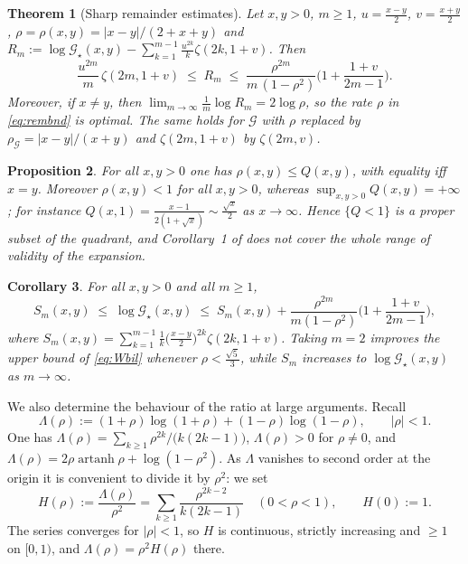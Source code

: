 \documentclass[11pt,a4paper]{amsart}
\newtheorem{theorem}{Theorem}[section]
\newtheorem{proposition}[theorem]{Proposition}
\newtheorem{corollary}[theorem]{Corollary}
\theoremstyle{definition}
\newcommand{\Gg}{\mathcal{G}}
\newcommand{\Gs}{\mathcal{G}_{\star}}
\DeclareMathOperator{\arsh}{artanh}
\begin{document}
\begin{theorem}[Sharp remainder estimates]\label{thm:rem}
Let $x,y>0$, $m\ge1$, $u=\tfrac{x-y}{2}$, $v=\tfrac{x+y}{2}$,
$\rho=\rho(x,y)=|x-y|/(2+x+y)$ and
$R_m:=\log\Gs(x,y)-\sum_{k=1}^{m-1}\frac{u^{2k}}{k}\zeta(2k,1+v)$. Then
\begin{equation}\label{eq:rembnd}
  \frac{u^{2m}}{m}\,\zeta(2m,1+v)\;\le\;R_m\;\le\;
  \frac{\rho^{2m}}{m\,(1-\rho^{2})}\Big(1+\frac{1+v}{2m-1}\Big).
\end{equation}
Moreover, if $x\ne y$, then $\lim_{m\to\infty}\frac{1}{m}\log R_m=2\log\rho$, so the rate
$\rho$ in \eqref{eq:rembnd} is optimal. The same holds for $\Gg$ with $\rho$ replaced by
$\rho_{\Gg}=|x-y|/(x+y)$ and $\zeta(2m,1+v)$ by $\zeta(2m,v)$.
\end{theorem}

\begin{proposition}\label{prop:compare}
For all $x,y>0$ one has $\rho(x,y)\le Q(x,y)$, with equality iff $x=y$. Moreover
$\rho(x,y)<1$ for all $x,y>0$, whereas $\sup_{x,y>0}Q(x,y)=+\infty$; for instance
$Q(x,1)=\frac{x-1}{2(1+\sqrt x)}\sim\frac{\sqrt x}{2}$ as $x\to\infty$. Hence $\{Q<1\}$ is a
proper subset of the quadrant, and Corollary~1 of \cite{Wisniewska25} does not cover the
whole range of validity of the expansion.
\end{proposition}

\begin{corollary}\label{cor:bil}
For all $x,y>0$ and all $m\ge1$,
\[
  S_m(x,y)\;\le\;\log\Gs(x,y)\;\le\;S_m(x,y)+
  \frac{\rho^{2m}}{m(1-\rho^{2})}\Big(1+\frac{1+v}{2m-1}\Big),
\]
where $S_m(x,y)=\sum_{k=1}^{m-1}\frac{1}{k}\big(\frac{x-y}{2}\big)^{2k}\zeta(2k,1+v)$.
Taking $m=2$ improves the upper bound of \eqref{eq:Wbil} whenever
$\rho<\frac{\sqrt5}{3}$, while $S_m$ increases to $\log\Gs(x,y)$ as $m\to\infty$.
\end{corollary}

We also determine the behaviour of the ratio at large arguments. Recall
\begin{equation}\label{eq:Lambda}
  \Lambda(\rho):=(1+\rho)\log(1+\rho)+(1-\rho)\log(1-\rho),\qquad |\rho|<1 .
\end{equation}
One has $\Lambda(\rho)=\sum_{k\ge1}\rho^{2k}/\big(k(2k-1)\big)$, $\Lambda(\rho)>0$ for
$\rho\ne0$, and $\Lambda(\rho)=2\rho\arsh\rho+\log(1-\rho^{2})$. As $\Lambda$ vanishes to
second order at the origin it is convenient to divide it by $\rho^{2}$: we set
\begin{equation}\label{eq:H}
  H(\rho):=\frac{\Lambda(\rho)}{\rho^{2}}
   =\sum_{k\ge1}\frac{\rho^{2k-2}}{k(2k-1)}\quad(0<\rho<1),
  \qquad H(0):=1 .
\end{equation}
The series converges for $|\rho|<1$, so $H$ is continuous, strictly increasing and
$\ge1$ on $[0,1)$, and $\Lambda(\rho)=\rho^{2}H(\rho)$ there.
\end{document}
